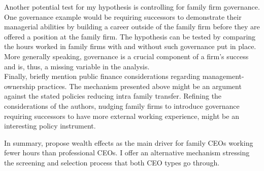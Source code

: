 Another potential test for my hypothesis is controlling for family firm governance. One governance example would be requiring successors to demonstrate their managerial abilities by building a career outside of the family firm before they are offered a position at the family firm. The hypothesis can be tested by comparing the hours worked in family firms with and without such governance put in place. 
More generally speaking, governance is a crucial component of a firm's success and is, thus, a missing variable in the analysis. \\

Finally, \textcite{bandiera_18} briefly mention public finance considerations regarding management-ownership practices. The mechanism presented above might be an argument against the stated policies reducing intra family transfer. Refining the considerations of the authors, nudging family firms to introduce governance requiring successors to have more external working experience, might be an interesting policy instrument.

In summary, \textcite{bandiera_18} propose wealth effects as the main driver for family CEOs working fewer hours than professional CEOs. I offer an alternative mechanism stressing the screening and selection process that both CEO types go through. 


